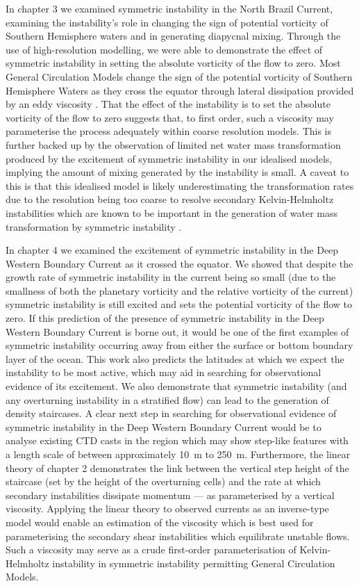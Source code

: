 In chapter 3 we examined symmetric instability in the North Brazil Current, examining the instability's role in changing the sign of potential vorticity of Southern Hemisphere waters and in generating diapycnal mixing. Through the use of high-resolution modelling, we were able to demonstrate the effect of symmetric instability in setting the absolute vorticity of the flow to zero. Most General Circulation Models change the sign of the potential vorticity of Southern Hemisphere Waters as they cross the equator through lateral dissipation provided by an eddy viscosity \citep{Edwards1998I}. That the effect of the instability is to set the absolute vorticity of the flow to zero suggests that, to first order, such a viscosity may parameterise the process adequately within coarse resolution models. This is further backed up by the observation of limited net water mass transformation produced by the excitement of symmetric instability in our idealised models, implying the amount of mixing generated by the instability is small. A caveat to this is that this idealised model is likely underestimating the transformation rates due to the resolution being too coarse to resolve secondary Kelvin-Helmholtz instabilities which are known to be important in the generation of water mass transformation by symmetric instability \citep[e.g.][]{Yankovsky2019, Griffiths2003a}.

In chapter 4 we examined the excitement of symmetric instability in the Deep Western Boundary Current as it crossed the equator. We showed that despite the growth rate of symmetric instability in the current being so small (due to the smallness of both the planetary vorticity and the relative vorticity of the current) symmetric instability is still excited and sets the potential vorticity of the flow to zero. If this prediction of the presence of symmetric instability in the Deep Western Boundary Current is borne out, it would be one of the first examples of symmetric instability occurring away from either the surface or bottom boundary layer of the ocean. This work also predicts the latitudes at which we expect the instability to be most active, which may aid in searching for observational evidence of its excitement. We also demonstrate that symmetric instability (and any overturning instability in a stratified flow) can lead to the generation of density staircases. A clear next step in searching for observational evidence of symmetric instability in the Deep Western Boundary Current would be to analyse existing CTD casts in the region which may show step-like features with a length scale of between approximately 10~m to 250~m. Furthermore, the linear theory of chapter 2 demonstrates the link between the vertical step height of the staircase (set by the height of the overturning cells) and the rate at which secondary instabilities dissipate momentum --- as parameterised by a vertical viscosity. Applying the linear theory to observed currents as an inverse-type model would enable an estimation of the viscosity which is best used for parameterising the secondary shear instabilities which equilibrate unstable flows. Such a viscosity may serve as a crude first-order parameterisation of Kelvin-Helmholtz instability in symmetric instability permitting General Circulation Models.

